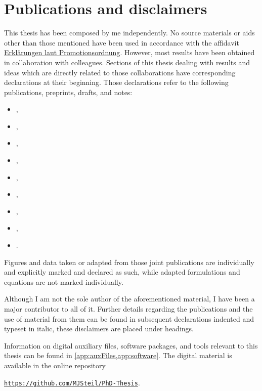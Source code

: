 \section{Publications and disclaimers}\label{sec:publications}
This thesis has been composed by me independently.
No source materials or aids other than those mentioned have been used in accordance with the affidavit \dash{} \hyperref[chap:affidavit]{Erklärungen laut Promotionsordnung}.
However, most results have been obtained in collaboration with colleagues.
Sections of this thesis dealing with results and ideas which are directly related to those collaborations have corresponding declarations at their beginning.
Those declarations refer to the following publications, preprints, drafts, and notes:
\begin{itemize}[leftmargin=4em,align=left]
	\item[\cite{Koenigstein:2021syz}] , %
	\item[\cite{Koenigstein:2021rxj}] , %
	\item[\cite{Steil:2021cbu}] , %
	\item[\cite{Stoll:2021ori}] , %
	\item[\cite{Koenigstein:2021llr}] , %
	\item[\cite{Steil:2023RGMF}] , %
	\item[\cite{Steil:partIV}] , %
	\item[\cite{Koenigstein:fixedPoint}] , %
	\item[\cite{Koenigstein:2021numericalSchemes}] .%
\end{itemize}\clearpage
Figures and data taken or adapted from those joint publications are individually and explicitly marked and declared as such, while adapted formulations and equations are not marked individually.

Although I am not the sole author of the aforementioned material, I have been a major contributor to all of it.
Further details regarding the publications and the use of material from them can be found in subsequent declarations \dash{} indented and typeset in italic, these disclaimers are placed under headings.

Information on digital auxiliary files, software packages, and tools relevant to this thesis can be found in \cref{app:auxFiles,app:software}.
The digital material is available in the online repository
\begin{center}
	\texttt{\smaller\href{https://github.com/MJSteil/PhD-Thesis}{https://github.com/MJSteil/PhD-Thesis}}.
\end{center}
